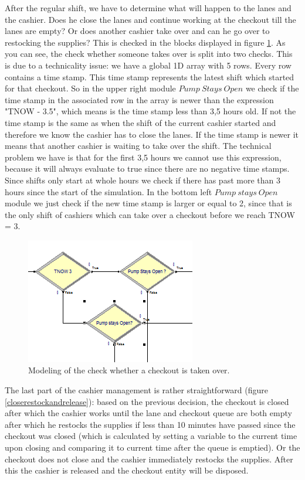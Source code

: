 After the regular shift, we have to determine what will happen to the lanes and the cashier. Does he close the lanes and continue working at the checkout till the lanes are empty? Or does another cashier take over and can he go over to restocking the supplies? This is checked in the blocks displayed in figure \ref{fig:determinetakeover}. As you can see, the check whether someone takes over is split into two checks. This is due to a technicality issue: we have a global 1D array with 5 rows. Every row contains a time stamp. This time stamp represents the latest shift which started for that checkout. So in the upper right module $Pump \ Stays \ Open$ we check if the time stamp in the associated row in the array is newer than the expression "TNOW - 3.5", which means is the time stamp less than 3,5 hours old. If not the time stamp is the same as when the shift of the current cashier started and therefore we know the cashier has to close the lanes. If the time stamp is newer it means that another cashier is waiting to take over the shift. The technical problem we have is that for the first 3,5 hours we cannot use this expression, because it will always evaluate to true since there are no negative time stamps. Since shifts only start at whole hours we check if there has past more than 3 hours since the start of the simulation. In the bottom left $Pump \ stays \ Open$ module we just check if the new time stamp is larger or equal to 2, since that is the only shift of cashiers which can take over a checkout before we reach TNOW = 3. 

\begin{figure}[]
\begin{center}
	\includegraphics[scale=1]{images/model-description/determine-takeover.PNG}
	\caption{Modeling of the check whether a checkout is taken over.}
	\label{fig:determinetakeover}
\end{center}
\end{figure}

The last part of the cashier management is rather straightforward (figure \ref{closerestockandrelease}): based on the previous decision, the checkout is closed after which the cashier works until the lane and checkout queue are both empty after which he restocks the supplies if less than 10 minutes have passed since the checkout was closed (which is calculated by setting a variable to the current time upon closing and comparing it to current time after the queue is emptied). Or the checkout does not close and the cashier immediately restocks the supplies.
After this the cashier is released and the checkout entity will be disposed.

